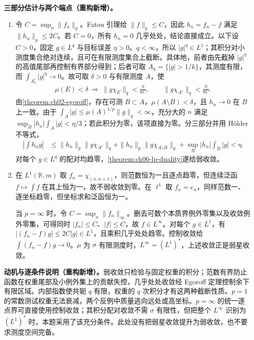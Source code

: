 \documentclass[../../main.tex]{subfiles}
\begin{document}
\begin{solution}
\textbf{三部分估计与两个端点（重构新增）。}
\begin{enumerate}
\item 令 $C=\sup_n\|f_n\|_p$。Fatou 引理给 $\|f\|_p\leqslant C$，因此 $h_n=f_n-f$ 满足 $\|h_n\|_p\leqslant2C$。若 $C=0$，所有 $h_n=0$ 几乎处处，结论直接成立。以下设 $C>0$，固定 $g\in L^q$ 与目标误差 $\eta>0$。$q<\infty$，所以 $|g|^q\in L^1$；其积分对小测度集合绝对连续，且可在有限测度集合上截断。具体地，前者由先截掉 $|g|^q$ 的高值尾部再控制有界部分得到；后者可取 $A_k=\{|g|>1/k\}$，其测度有限，而 $\int_{A_k^c}|g|^q\to0$。故可取 $\delta>0$ 与有限测度 $A$，使
\begin{align*}
\mu(E)<\delta\ \Longrightarrow\ \|g\chi_E\|_q<\frac{\eta}{6C},
\qquad \|g\chi_{A^c}\|_q<\frac{\eta}{6C}.
\end{align*}
由\cref{theorem:ch02-egoroff}，存在可测 $B\subset A$，$\mu(A\setminus B)<\delta$，且 $h_n\to0$ 在 $B$ 上一致。由于 $\int_A|g|\leqslant\mu(A)^{1/p}\|g\|_q<\infty$，充分大的 $n$ 满足 $\sup_B|h_n|\int_A|g|<\eta/3$；若此积分为零，该项直接为零。分三部分并用 Hölder 不等式，
\begin{align*}
\left|\int h_ng\right|
&\leqslant\|h_n\|_p\|g\chi_{A^c}\|_q
+\|h_n\|_p\|g\chi_{A\setminus B}\|_q
+\sup_B|h_n|\int_B|g|<\eta.
\end{align*}
对每个 $g\in L^q$ 的配对均趋零，\cref{theorem:ch06-lp-duality}遂给弱收敛。
\item 在 $L^1(\mathbb R,m)$ 取 $f_n=\chi_{(n,n+1)}$，则范数恒为一且逐点趋零，但连续泛函 $f\mapsto\int f$ 在其上恒为一，故不弱收敛到零。在 $\ell^1$ 取 $f_n=e_n$，同样范数一、逐坐标趋零，但坐标求和泛函恒为一。

当 $p=\infty$ 时，令 $C=\sup_n\|f_n\|_\infty$。删去可数个本质界例外零集以及收敛例外零集，可得同时 $|f_n|\leqslant C$、$|f|\leqslant C$，故 $f\in L^\infty$。对每个 $g\in L^1$，有 $|(f_n-f)g|\leqslant2C|g|\in L^1$，且乘积几乎处处趋零。控制收敛给 $\int(f_n-f)g\to0$。$\mu$ 为 $\sigma$ 有限测度时，$L^\infty=(L^1)^*$，上述收敛正是弱星收敛。
\end{enumerate}
\end{solution}
\begin{remark}
\textbf{动机与逐条件说明（重构新增）。}弱收敛只检验与固定权重的积分；范数有界防止函数在权重尾部及小例外集上的贡献失控，几乎处处收敛经 Egoroff 定理控制余下有限区域。内部指数使共轭 $q$ 有限，权重的 $q$ 次积分才有这两种截断性质。$p=1$ 的常数测试权重无法衰减，两个反例中质量逃向远处或高坐标。$p=\infty$ 的统一逐点界可直接使用控制收敛；其积分配对收敛不需 $\sigma$ 有限性，但把整个 $L^\infty$ 识别为 $(L^1)^*$ 时，本题采用了该充分条件。此处没有把弱星收敛提升为弱收敛，也不要求测度空间完备。
\end{remark}
\end{document}
